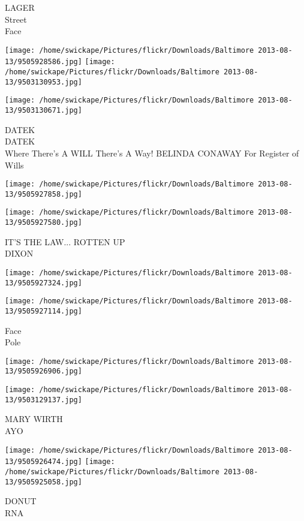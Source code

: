 \documentclass[10pt,letterpaper]{article}
\begin{document}
LAGER\\
Street\\
Face\\
\pagebreak

\texttt{[image: /home/swickape/Pictures/flickr/Downloads/Baltimore 2013-08-13/9505928586.jpg]}
\texttt{[image: /home/swickape/Pictures/flickr/Downloads/Baltimore 2013-08-13/9503130953.jpg]}

\texttt{[image: /home/swickape/Pictures/flickr/Downloads/Baltimore 2013-08-13/9503130671.jpg]}

DATEK\\
DATEK\\
Where There's A WILL There's A Way!  BELINDA CONAWAY For Register of Wills\\
\pagebreak

\texttt{[image: /home/swickape/Pictures/flickr/Downloads/Baltimore 2013-08-13/9505927858.jpg]}

\vspace{0.25in}
\texttt{[image: /home/swickape/Pictures/flickr/Downloads/Baltimore 2013-08-13/9505927580.jpg]}

IT'S THE LAW... ROTTEN UP\\
DIXON\\
\pagebreak

\texttt{[image: /home/swickape/Pictures/flickr/Downloads/Baltimore 2013-08-13/9505927324.jpg]}

\vspace{0.25in}
\texttt{[image: /home/swickape/Pictures/flickr/Downloads/Baltimore 2013-08-13/9505927114.jpg]}

Face\\
Pole\\
\pagebreak

\texttt{[image: /home/swickape/Pictures/flickr/Downloads/Baltimore 2013-08-13/9505926906.jpg]}

\vspace{0.25in}
\texttt{[image: /home/swickape/Pictures/flickr/Downloads/Baltimore 2013-08-13/9503129137.jpg]}

MARY WIRTH\\
AYO\\
\pagebreak

\texttt{[image: /home/swickape/Pictures/flickr/Downloads/Baltimore 2013-08-13/9505926474.jpg]}
\texttt{[image: /home/swickape/Pictures/flickr/Downloads/Baltimore 2013-08-13/9505925058.jpg]}

DONUT\\
RNA\\
\pagebreak
\end{document}
